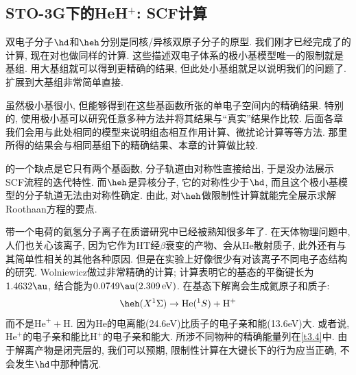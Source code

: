 \subsection{STO-3G下的HeH$^+$: SCF计算}
\label{sec3.5.3}
双电子分子$\hd$和$\heh$分别是同核/异核双原子分子的原型. 
我们刚才已经完成了的计算, 
现在对也做同样的计算. 
这些描述双电子体系的极小基模型唯一的限制就是基组. 
用大基组就可以得到更精确的结果, 
但此处小基组就足以说明我们的问题了. 
扩展到大基组非常简单直接. 


虽然极小基很小, 
但能够得到在这些基函数所张的单电子空间内的精确结果. 
特别的, 
使用极小基可以研究任意多种方法并将其结果与``真实''结果作比较. 
后面各章我们会用与此处相同的模型来说明组态相互作用计算、微扰论计算等等方法. 
那里所得的结果会与相同基组下的精确结果、本章的\hft 计算做比较.


的一个缺点是它只有两个基函数, 
分子轨道由对称性直接给出, 于是没办法展示SCF流程的迭代特性. 
而$\heh$是异核分子, 它的对称性少于$\hd$, 而且这个极小基模型的分子轨道无法由对称性确定. 
由此, 对$\heh$做限制性\hft 计算就能完全展示求解Roothaan方程的要点. 

带一个电荷的氦氢分子离子在质谱研究中已经被熟知很多年了.
在天体物理问题中, 人们也关心该离子, 
因为它作为$\mathrm{HT}$经$\beta$衰变的产物、会从$\mathrm{He}$散射质子,
此外还有与其简单性相关的其他各种原因. 
但是在实验上好像很少有对该离子不同电子态结构的研究.
Wolniewicz做过非常精确的计算; 计算表明它的基态的平衡键长为$1.4632\au$, 结合能为$0.0749\au(2.309\,\mathrm{eV})$. 
在基态下解离会生成氦原子和质子:
\begin{align}
	\heh(X^1\Sigma) \to \mathrm{He}(^1S) + \mathrm{H}^+
\end{align}
而不是$\mathrm{He}^+ + \mathrm{H}$. 
因为$\mathrm{He}$的电离能(24.6eV)比质子的电子亲和能(13.6eV)大. 
或者说, 
$\mathrm{He}^+$的电子亲和能比$\mathrm{H}^+$的电子亲和能大. 
所涉不同物种的精确能量列在\autoref{t3.4}中. 
由于解离产物是闭壳层的, 
我们可以预期, 
限制性\hft 计算在大键长下的行为应当正确, 
不会发生$\hd$中那种情况. 


